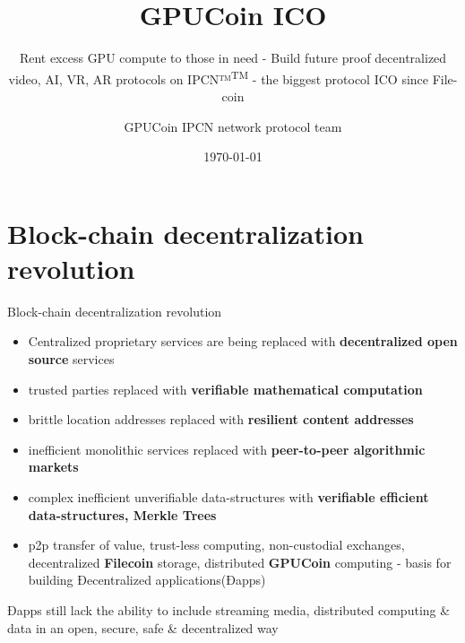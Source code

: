 \documentclass[10pt,handout]{beamer}
\title{ GPUCoin ICO }
\subtitle{Rent excess GPU compute to those in need - Build future proof decentralized video, AI, VR, AR protocols on IPCN™\textsuperscript{TM}
 - the biggest protocol ICO since File-coin}
\date{\today}
\author{GPUCoin IPCN
network protocol team}
\institute{\href{http://gpuco.in}{GPUCoin Foundation}}
\begin{document}
\maketitle


\section{Block-chain decentralization revolution}
\begin{frame}[fragile]{Block-chain decentralization revolution}
 \begin{itemize}[<+-| alert@+>]%
 
\item Centralized proprietary services are being replaced with \textbf{decentralized open source} services
\item trusted parties replaced with \textbf{verifiable mathematical computation}
\item brittle location addresses replaced with \textbf{resilient content addresses}
\item inefficient monolithic services replaced with \textbf{peer-to-peer algorithmic markets}
\item complex inefficient unverifiable data-structures with \textbf{verifiable efficient data-structures, Merkle Trees}
\item p2p transfer of value, trust-less computing, non-custodial exchanges, decentralized \textbf{Filecoin} storage, distributed \textbf{GPUCoin} computing - basis for building Ðecentralized applications(Ðapps)

\end{itemize}
 \pause
Ðapps still lack the ability to include streaming media, distributed computing \& data in an open, secure, safe \& decentralized way

\end{frame}
\end{document}
